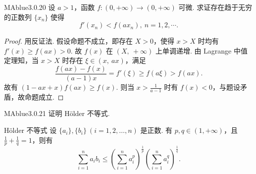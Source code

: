 \begin{problem}{MAblue}{3.0.20}
    设 $a > 1$，函数 $f : (0, +\infty) \to (0, +\infty)$ 可微. 求证存在趋于无穷的正数列 $\{ x_n \}$ 使得
    \[
        f'(x_n) < f(ax_n),\ n = 1, 2, \cdots.
    \]
\end{problem}

\begin{proof}
    用反证法. 假设命题不成立，即存在 $X > 0$，使得 $x > X$ 时均有 $f'(x) \geqslant f(ax) > 0$. 故 $f(x)$ 在 $(X,\ +\infty)$ 上单调递增. 由 Lagrange 中值定理知，当 $x > X$ 时存在 $\xi \in (x,\ ax)$，满足
    \[
        \frac{f(ax)-f(x)}{(a-1)x} = f'(\xi) \geqslant f(a\xi) > f(ax).
    \]
    故有 $(1-ax+x)f(ax) \geqslant f(x)$. 则当 $x > \frac 1 {a-1}$ 时有 $f(x) < 0$，与题设矛盾，故命题成立.
\end{proof}

\begin{problem}{MAblue}{3.0.21}
    证明 H{\"o}lder 不等式.
\end{problem}

\begin{center}
    \begin{minipage}{0.85\textwidth}
        \begin{theorem}{H{\"o}lder 不等式}{}
            设 $\{ a_i \}, \{ b_i \} \ (i = 1, 2, \ldots, n)$ 是正数. 有 $p, q \in (1, +\infty)$，且 $\frac 1 p + \frac 1 q = 1$，则有
            \[
                \sum_{i=1}^n a_ib_i \leqslant \left( \sum_{i=1}^n a_i^p \right)^{\frac 1 p} \left( \sum_{i=1}^n a_i^q \right)^{\frac 1 q}.
            \]
        \end{theorem}
    \end{minipage}
\end{center}

